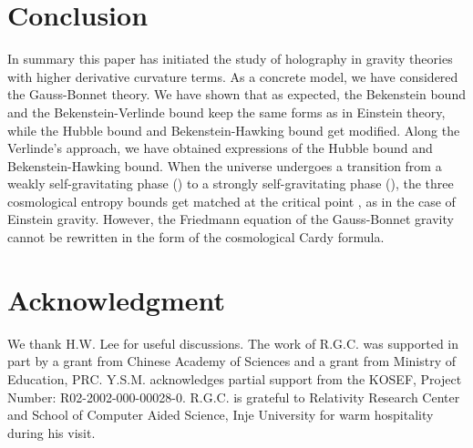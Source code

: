 \documentclass[a4paper,12pt]{article}
\providecommand{\sect}[1]{\setcounter{equation}{0}\section{#1}}
\begin{document}

\sect{Conclusion}

In summary this paper has initiated the study of holography in gravity theories with
higher derivative curvature terms. As a concrete  model, we have considered the Gauss-Bonnet
theory. We have shown that as expected, the Bekenstein bound and the Bekenstein-Verlinde
 bound keep the same forms as in Einstein theory,  while the Hubble bound and
Bekenstein-Hawking bound get modified. Along the Verlinde's approach, we have obtained
 expressions of the Hubble bound and Bekenstein-Hawking bound.  When the universe undergoes a transition from a weakly self-gravitating phase (\coordHE{}) to a strongly
self-gravitating phase (\coordHE{}), the three  cosmological entropy bounds get matched at the
critical point \coordHE{}, as in the case of Einstein gravity. However, the Friedmann
equation of the Gauss-Bonnet gravity cannot be rewritten in the form of the cosmological
Cardy formula.



\section*{Acknowledgment}

We thank H.W. Lee for useful discussions.
The work of R.G.C. was supported in part by a grant from Chinese
Academy of Sciences and a grant from Ministry of Education, PRC.
Y.S.M. acknowledges partial support from the KOSEF, Project
Number: R02-2002-000-00028-0.
R.G.C. is grateful to Relativity Research Center and School of Computer Aided
Science, Inje University for warm hospitality during his visit.
\end{document}
